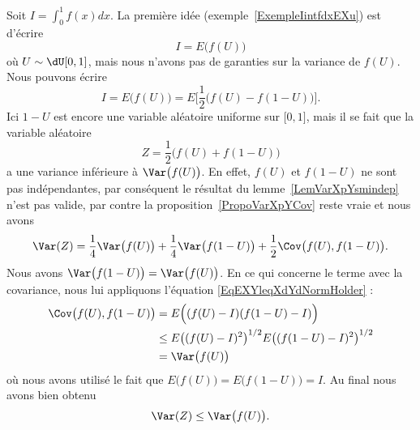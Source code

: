 Soit \( I=\int_0^1f(x)dx\). La première idée (exemple~\ref{ExempleIintfdxEXu}) est d'écrire
\begin{equation}
	I=E\big( f(U) \big)
\end{equation}
où \( U\sim\dU\mathopen[ 0 , 1 \mathclose]\), mais nous n'avons pas de garanties sur la variance de \( f(U)\). Nous pouvons écrire
\begin{equation}
	I=E\big( f(U) \big)=E\Big[ \frac{ 1 }{2}\big( f(U)-f(1-U) \big) \Big].
\end{equation}
Ici \( 1-U\) est encore une variable aléatoire uniforme sur \( \mathopen[ 0 , 1 \mathclose]\), mais il se fait que la variable aléatoire
\begin{equation}
	Z=\frac{ 1 }{2}\big( f(U)+f(1-U) \big)
\end{equation}
a une variance inférieure à \( \Var\big( f(U) \big)\). En effet, \( f(U)\) et \( f(1-U)\) ne sont pas indépendantes, par conséquent le résultat du lemme~\ref{LemVarXpYsmindep} n'est pas valide, par contre la proposition~\ref{PropoVarXpYCov} reste vraie et nous avons
\begin{equation}
	\Var(Z)=\frac{1}{ 4 }\Var\big( f(U) \big)+\frac{1}{ 4 }\Var\big( f(1-U) \big)+\frac{ 1 }{2}\Cov\big( f(U),f(1-U) \big).
\end{equation}
Nous avons \( \Var\big( f(1-U) \big)=\Var\big( f(U) \big)\). En ce qui concerne le terme avec la covariance, nous lui appliquons l'équation \eqref{EqEXYleqXdYdNormHolder} :
\begin{subequations}
	\begin{align}
		\Cov\big( f(U),f(1-U) \big) & =E\Big( (f(U)-I)(f(1-U)-I) \Big)                                  \\
		                            & \leq E\big( (f(U)-I)^2 \big)^{1/2}E\big( (f(1-U)-I)^2 \big)^{1/2} \\
		                            & =\Var\big( f(U) \big)
	\end{align}
\end{subequations}
où nous avons utilisé le fait que \( E\big( f(U) \big)=E\big( f(1-U) \big)=I\). Au final nous avons bien obtenu
\begin{equation}
	\Var(Z)\leq \Var\big( f(U) \big).
\end{equation}
